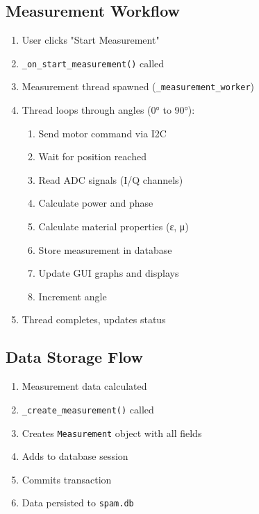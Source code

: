 \documentclass[11pt,a4paper]{article}
\begin{document}
\subsection{Measurement Workflow}
\begin{enumerate}
    \item User clicks "Start Measurement"
    \item \texttt{\_on\_start\_measurement()} called
    \item Measurement thread spawned (\texttt{\_measurement\_worker})
    \item Thread loops through angles (0° to 90°):
    \begin{enumerate}
        \item Send motor command via I2C
        \item Wait for position reached
        \item Read ADC signals (I/Q channels)
        \item Calculate power and phase
        \item Calculate material properties (ε, μ)
        \item Store measurement in database
        \item Update GUI graphs and displays
        \item Increment angle
    \end{enumerate}
    \item Thread completes, updates status
\end{enumerate}

\subsection{Data Storage Flow}
\begin{enumerate}
    \item Measurement data calculated
    \item \texttt{\_create\_measurement()} called
    \item Creates \texttt{Measurement} object with all fields
    \item Adds to database session
    \item Commits transaction
    \item Data persisted to \texttt{spam.db}
\end{enumerate}
\end{document}
